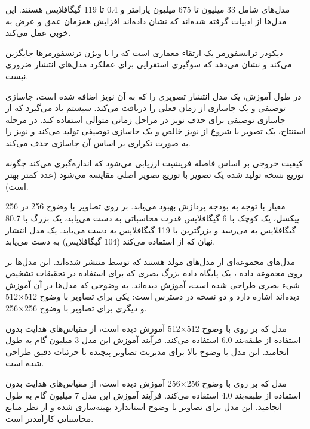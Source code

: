 مدل‌های  شامل 33 میلیون تا 675 میلیون پارامتر و 0.4 تا 119 گیگافلاپس هستند. این مدل‌ها از ادبیات  گرفته شده‌اند که نشان داده‌اند افزایش همزمان عمق و عرض به خوبی عمل می‌کند.

دیکودر ترانسفورمر یک ارتقاء معماری است که  را با ویژن ترنسفورمرها جایگزین می‌کند و نشان می‌دهد که سوگیری استقرایی  برای عملکرد مدل‌های انتشار ضروری نیست.

در طول آموزش، یک مدل انتشار تصویری را که به آن نویز اضافه شده است، جاسازی توصیفی و یک جاسازی از زمان فعلی را دریافت می‌کند. سیستم یاد می‌گیرد که از جاسازی توصیفی برای حذف نویز در مراحل زمانی متوالی استفاده کند. در مرحله استنتاج، یک تصویر با شروع از نویز خالص و یک جاسازی توصیفی تولید می‌کند و نویز را به صورت تکراری بر اساس آن جاسازی حذف می‌کند.

کیفیت خروجی  بر اساس فاصله فریشیت ارزیابی می‌شود که اندازه‌گیری می‌کند چگونه توزیع نسخه تولید شده یک تصویر با توزیع تصویر اصلی مقایسه می‌شود (عدد کمتر بهتر است).

معیار  با توجه به بودجه پردازش بهبود می‌یابد. بر روی تصاویر  با وضوح 256 در 256 پیکسل، یک  کوچک با 6 گیگافلاپس قدرت محاسباتی به  دست می‌یابد، یک  بزرگ با 80.7 گیگافلاپس به  می‌رسد و بزرگترین  با 119 گیگافلاپس به  دست می‌یابد. یک مدل انتشار نهان که از  استفاده می‌کند (104 گیگافلاپس) به  دست می‌یابد.







مدل‌های  مجموعه‌ای از مدل‌های مولد هستند که توسط  منتشر شده‌اند. این مدل‌ها بر روی مجموعه داده ، یک پایگاه داده بزرگ بصری که برای استفاده در تحقیقات تشخیص شیء بصری طراحی شده است، آموزش دیده‌اند.  به وضوحی که مدل‌ها در آن آموزش دیده‌اند اشاره دارد و دو نسخه در دسترس است: یکی برای تصاویر با وضوح 512×512 و دیگری برای تصاویر با وضوح 256×256.

مدل  که بر روی  با وضوح 512×512 آموزش دیده است، از مقیاس‌های هدایت بدون استفاده از طبقه‌بند 6.0 استفاده می‌کند. فرآیند آموزش این مدل 3 میلیون گام به طول انجامید. این مدل با وضوح بالا برای مدیریت تصاویر پیچیده با جزئیات دقیق طراحی شده است.

مدل  که بر روی  با وضوح 256×256 آموزش دیده است، از مقیاس‌های هدایت بدون استفاده از طبقه‌بند 4.0 استفاده می‌کند. فرآیند آموزش این مدل 7 میلیون گام به طول انجامید. این مدل برای تصاویر با وضوح استاندارد بهینه‌سازی شده و از نظر منابع محاسباتی کارآمدتر است.

